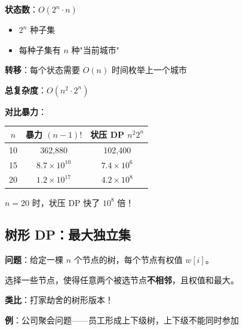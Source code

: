 \documentclass[12pt, a4paper]{ctexart}
\begin{document}
\begin{blackboard}

\textbf{状态数}：$O(2^n \cdot n)$
\begin{itemize}
    \item $2^n$ 种子集
    \item 每种子集有 $n$ 种"当前城市"
\end{itemize}

\textbf{转移}：每个状态需要 $O(n)$ 时间枚举上一个城市

\textbf{总复杂度}：$O(n^2 \cdot 2^n)$

\textbf{对比暴力}：
\begin{center}
\begin{tabular}{c|cc}
$n$ & 暴力 $(n-1)!$ & 状压 DP $n^2 2^n$ \\
\hline
10 & 362,880 & 102,400 \\
15 & $8.7 \times 10^{10}$ & $7.4 \times 10^6$ \\
20 & $1.2 \times 10^{17}$ & $4.2 \times 10^8$ \\
\end{tabular}
\end{center}

$n = 20$ 时，状压 DP 快了 $10^8$ 倍！

\end{blackboard}

\subsection{树形 DP：最大独立集}

\begin{blackboard}[树上最大独立集问题]

\textbf{问题}：给定一棵 $n$ 个节点的树，每个节点有权值 $w[i]$。

选择一些节点，使得任意两个被选节点\textbf{不相邻}，且权值和最大。

\textbf{类比}：打家劫舍的树形版本！

\textbf{例}：公司聚会问题——员工形成上下级树，上下级不能同时参加

\end{blackboard}
\end{document}
